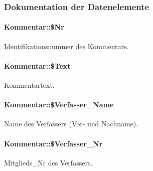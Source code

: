 \subsubsection{Dokumentation der Datenelemente}
\hypertarget{classKommentar_1b0a3cfcb9fc7075f985cc8067ab1982}{
\paragraph[\$Nr]{\setlength{\rightskip}{0pt plus 5cm}Kommentar::\$Nr}\hfill}
\label{classKommentar_1b0a3cfcb9fc7075f985cc8067ab1982}


Identifikationsnummer des Kommentars. 

\hypertarget{classKommentar_c9a481413d6ba0c000719ad514bad4b5}{
\paragraph[\$Text]{\setlength{\rightskip}{0pt plus 5cm}Kommentar::\$Text}\hfill}
\label{classKommentar_c9a481413d6ba0c000719ad514bad4b5}


Kommentartext. 

\hypertarget{classKommentar_84f0fc10295968adde28169f8df018d9}{
\paragraph[\$Verfasser\_\-Name]{\setlength{\rightskip}{0pt plus 5cm}Kommentar::\$Verfasser\_\-Name}\hfill}
\label{classKommentar_84f0fc10295968adde28169f8df018d9}


Name des Verfassers (Vor- und Nachname). 

\hypertarget{classKommentar_c92b002e40690ee052fec446ff2a0ef6}{
\paragraph[\$Verfasser\_\-Nr]{\setlength{\rightskip}{0pt plus 5cm}Kommentar::\$Verfasser\_\-Nr}\hfill}
\label{classKommentar_c92b002e40690ee052fec446ff2a0ef6}


Mitglieds\_\-Nr des Verfassers. 

